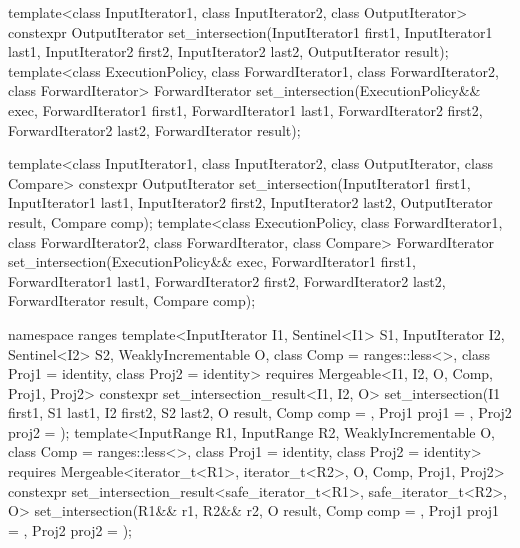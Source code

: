 %
\begin{itemdecl}
template<class InputIterator1, class InputIterator2,
         class OutputIterator>
  constexpr OutputIterator
    set_intersection(InputIterator1 first1, InputIterator1 last1,
                     InputIterator2 first2, InputIterator2 last2,
                     OutputIterator result);
template<class ExecutionPolicy, class ForwardIterator1, class ForwardIterator2,
         class ForwardIterator>
  ForwardIterator
    set_intersection(ExecutionPolicy&& exec,
                     ForwardIterator1 first1, ForwardIterator1 last1,
                     ForwardIterator2 first2, ForwardIterator2 last2,
                     ForwardIterator result);

template<class InputIterator1, class InputIterator2,
         class OutputIterator, class Compare>
  constexpr OutputIterator
    set_intersection(InputIterator1 first1, InputIterator1 last1,
                     InputIterator2 first2, InputIterator2 last2,
                     OutputIterator result, Compare comp);
template<class ExecutionPolicy, class ForwardIterator1, class ForwardIterator2,
         class ForwardIterator, class Compare>
  ForwardIterator
    set_intersection(ExecutionPolicy&& exec,
                     ForwardIterator1 first1, ForwardIterator1 last1,
                     ForwardIterator2 first2, ForwardIterator2 last2,
                     ForwardIterator result, Compare comp);

namespace ranges {
  template<InputIterator I1, Sentinel<I1> S1, InputIterator I2, Sentinel<I2> S2,
           WeaklyIncrementable O, class Comp = ranges::less<>,
           class Proj1 = identity, class Proj2 = identity>
    requires Mergeable<I1, I2, O, Comp, Proj1, Proj2>
    constexpr set_intersection_result<I1, I2, O>
      set_intersection(I1 first1, S1 last1, I2 first2, S2 last2, O result,
                       Comp comp = {}, Proj1 proj1 = {}, Proj2 proj2 = {});
  template<InputRange R1, InputRange R2, WeaklyIncrementable O,
           class Comp = ranges::less<>, class Proj1 = identity, class Proj2 = identity>
    requires Mergeable<iterator_t<R1>, iterator_t<R2>, O, Comp, Proj1, Proj2>
    constexpr set_intersection_result<safe_iterator_t<R1>, safe_iterator_t<R2>, O>
      set_intersection(R1&& r1, R2&& r2, O result,
                       Comp comp = {}, Proj1 proj1 = {}, Proj2 proj2 = {});
}
\end{itemdecl}

